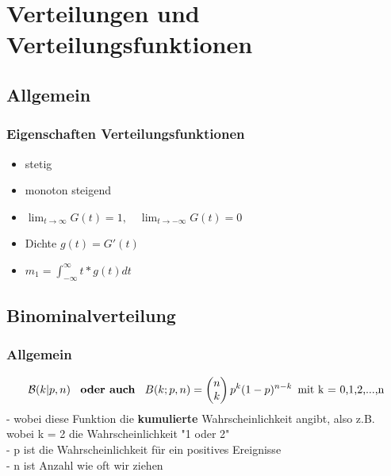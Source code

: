 \documentclass{article}
\begin{document}
\section{Verteilungen und Verteilungsfunktionen}
\subsection{Allgemein}
\subsubsection{Eigenschaften Verteilungsfunktionen}
\begin{itemize}		
	\item stetig
	\item monoton steigend
	\item $\lim_{t \to \infty} G(t) = 1, \quad \lim_{t \to -\infty} G(t) = 0$
	\item Dichte $g(t) = G'(t)$
	\item $m_1 = \int_{-\infty}^{\infty}t*g(t)dt$
\end{itemize}
\subsection{Binominalverteilung}
\subsubsection{Allgemein}
\[
	\mathcal{B}(k | p,n) \enspace \textbf{ oder auch } \enspace B(k;p,n) =
\begin{pmatrix} n \\ k \end{pmatrix} p^k(1-p)^{n-k} \enspace \newline
\text{mit k = 0,1,2,...,n} \]
- wobei diese Funktion die \textbf{kumulierte} Wahrscheinlichkeit angibt, also z.B.
wobei k = 2 die Wahrscheinlichkeit "1 oder 2"
\\ - p ist die Wahrscheinlichkeit f\"ur ein positives Ereignisse
\\ - n ist Anzahl wie oft wir ziehen
\end{document}
